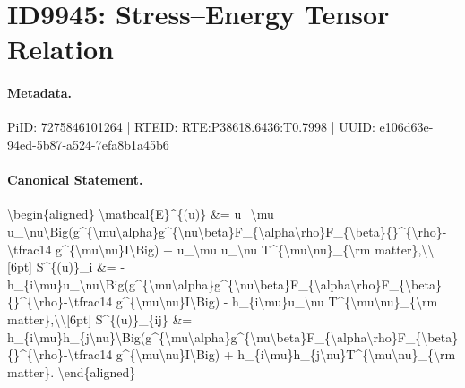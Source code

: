 \section*{ID9945: Stress–Energy Tensor Relation}
\paragraph{Metadata.}
PiID: 7275846101264 | RTEID: RTE:P38618.6436:T0.7998 | UUID: e106d63e-94ed-5b87-a524-7efa8b1a45b6

\paragraph{Canonical Statement.}
\textbackslash{}begin\{aligned\} \textbackslash{}mathcal\{E\}\textasciicircum{}\{(u)\} \&= u\_\textbackslash{}mu u\_\textbackslash{}nu\textbackslash{}Big(g\textasciicircum{}\{\textbackslash{}mu\textbackslash{}alpha\}g\textasciicircum{}\{\textbackslash{}nu\textbackslash{}beta\}F\_\{\textbackslash{}alpha\textbackslash{}rho\}F\_\{\textbackslash{}beta\}\{\}\textasciicircum{}\{\textbackslash{}rho\}-\textbackslash{}tfrac14 g\textasciicircum{}\{\textbackslash{}mu\textbackslash{}nu\}I\textbackslash{}Big) + u\_\textbackslash{}mu u\_\textbackslash{}nu T\textasciicircum{}\{\textbackslash{}mu\textbackslash{}nu\}\_\{\textbackslash{}rm matter\},\textbackslash{}\textbackslash{}[6pt] S\textasciicircum{}\{(u)\}\_i \&= -h\_\{i\textbackslash{}mu\}u\_\textbackslash{}nu\textbackslash{}Big(g\textasciicircum{}\{\textbackslash{}mu\textbackslash{}alpha\}g\textasciicircum{}\{\textbackslash{}nu\textbackslash{}beta\}F\_\{\textbackslash{}alpha\textbackslash{}rho\}F\_\{\textbackslash{}beta\}\{\}\textasciicircum{}\{\textbackslash{}rho\}-\textbackslash{}tfrac14 g\textasciicircum{}\{\textbackslash{}mu\textbackslash{}nu\}I\textbackslash{}Big) - h\_\{i\textbackslash{}mu\}u\_\textbackslash{}nu T\textasciicircum{}\{\textbackslash{}mu\textbackslash{}nu\}\_\{\textbackslash{}rm matter\},\textbackslash{}\textbackslash{}[6pt] S\textasciicircum{}\{(u)\}\_\{ij\} \&= h\_\{i\textbackslash{}mu\}h\_\{j\textbackslash{}nu\}\textbackslash{}Big(g\textasciicircum{}\{\textbackslash{}mu\textbackslash{}alpha\}g\textasciicircum{}\{\textbackslash{}nu\textbackslash{}beta\}F\_\{\textbackslash{}alpha\textbackslash{}rho\}F\_\{\textbackslash{}beta\}\{\}\textasciicircum{}\{\textbackslash{}rho\}-\textbackslash{}tfrac14 g\textasciicircum{}\{\textbackslash{}mu\textbackslash{}nu\}I\textbackslash{}Big) + h\_\{i\textbackslash{}mu\}h\_\{j\textbackslash{}nu\}T\textasciicircum{}\{\textbackslash{}mu\textbackslash{}nu\}\_\{\textbackslash{}rm matter\}. \textbackslash{}end\{aligned\}

